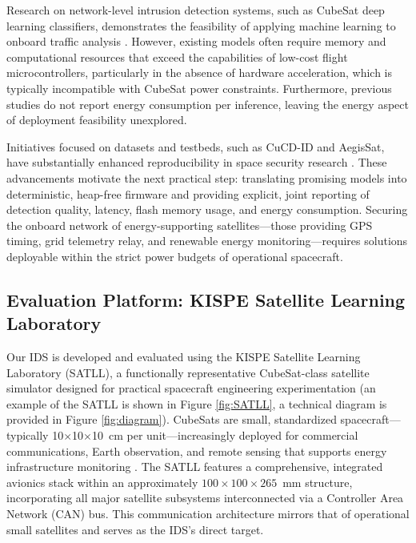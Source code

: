 Research on network-level intrusion detection systems, such as CubeSat deep learning classifiers, demonstrates the feasibility of applying machine learning to onboard traffic analysis \cite{ESA2023}. However, existing models often require memory and computational resources that exceed the capabilities of low-cost flight microcontrollers, particularly in the absence of hardware acceleration, which is typically incompatible with CubeSat power constraints. Furthermore, previous studies do not report energy consumption per inference, leaving the energy aspect of deployment feasibility unexplored.

Initiatives focused on datasets and testbeds, such as CuCD-ID and AegisSat, have substantially enhanced reproducibility in space security research \cite{CuCDID2026, AegisSat2025}. These advancements motivate the next practical step: translating promising models into deterministic, heap-free firmware and providing explicit, joint reporting of detection quality, latency, flash memory usage, and energy consumption. Securing the onboard network of energy-supporting satellites---those providing GPS timing, grid telemetry relay, and renewable energy monitoring---requires solutions deployable within the strict power budgets of operational spacecraft.

\subsection{Evaluation Platform: KISPE Satellite Learning Laboratory}

Our IDS is developed and evaluated using the KISPE Satellite Learning Laboratory (SATLL), a functionally representative CubeSat-class satellite simulator designed for practical spacecraft engineering experimentation \cite{KISPE2025, Sellers2022} (an example of the SATLL is shown in Figure \ref{fig:SATLL}, a technical diagram is provided in Figure \ref{fig:diagram}). CubeSats are small, standardized spacecraft---typically 10$\times$10$\times$10~cm per unit---increasingly deployed for commercial communications, Earth observation, and remote sensing that supports energy infrastructure monitoring \cite{Sellers2022}. The SATLL features a comprehensive, integrated avionics stack within an approximately $100 \times 100 \times 265$~mm structure, incorporating all major satellite subsystems interconnected via a Controller Area Network (CAN) bus. This communication architecture mirrors that of operational small satellites and serves as the IDS's direct target.



